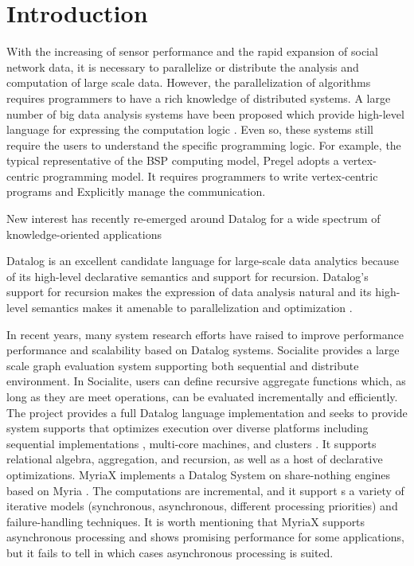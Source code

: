 \section{Introduction}
With the increasing of sensor performance and the rapid expansion of social network data, it is necessary to parallelize or distribute the analysis and computation of large scale data. However, the parallelization of algorithms requires programmers to have a rich knowledge of distributed systems. A large number of big data analysis systems have been proposed which provide high-level language for expressing the computation logic \cite{}. Even so, these systems still require the users to understand the specific programming logic. For example, the typical representative of the BSP computing model, Pregel \cite{} adopts a vertex-centric programming model. It requires programmers to write vertex-centric programs and Explicitly manage the communication.

New interest has recently re-emerged around Datalog for a wide spectrum of knowledge-oriented applications \cite{}%

Datalog is an excellent candidate language for large-scale data analytics because of its high-level declarative semantics and support for recursion. Datalog's support for recursion makes the expression of data analysis natural \cite{} and its high-level semantics makes it amenable to parallelization and optimization \cite{}.


In recent years, many system research efforts have raised to improve performance performance and scalability based on Datalog systems. Socialite \cite{socialite} provides a large scale graph evaluation system supporting both sequential and distribute environment. In Socialite, users can define recursive aggregate functions which, as long as they are meet operations, can be evaluated incrementally and efficiently. The \cite{7113340} project provides a full Datalog language implementation and seeks to provide  system supports that optimizes execution over diverse platforms including sequential implementations \cite{Shkapsky:2016:BDA:2882903.2915229}, multi-core machines, and clusters \cite{bigdatalog}. It supports relational algebra, aggregation, and recursion, as well as a host of declarative optimizations. MyriaX \cite{Halperin:2014:DMB:2588555.2594530} implements a Datalog System on share-nothing engines based on Myria \cite{}. The computations are incremental, and it support s a variety of iterative models (synchronous, asynchronous, different processing priorities) and failure-handling techniques. It is worth mentioning that MyriaX supports asynchronous processing and shows promising performance for some applications, but it fails to tell in which cases asynchronous processing is suited.

